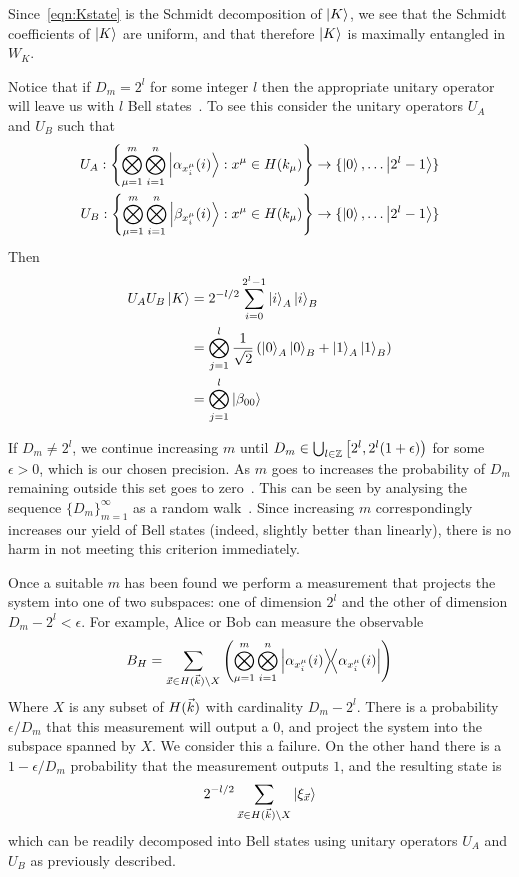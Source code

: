 Since~\eqref{eqn:Kstate} is the Schmidt decomposition of $\ket{K}$, we see that the Schmidt coefficients of $\ket{K}$ are uniform, and that therefore $\ket{K}$ is maximally entangled in $W_K$.

Notice that if $D_m = 2^l$ for some integer $l$ then the appropriate unitary operator will leave us with $l$ Bell states~\cite{bennett1996concentrating}. To see this consider the unitary operators $U_A$ and $U_B$ such that
\begin{align*}
U_A : \left\{
\bigotimes_{\mu=1}^m\bigotimes_{i=1}^n 
\ket{\alpha_{x_i^\mu}(i)}: x^\mu \in H(k_\mu) 
\right\} &\rightarrow \{\ket{0}, \ldots \ket{2^l-1
}\} \\
U_B :\left\{
\bigotimes_{\mu=1}^m\bigotimes_{i=1}^n 
\ket{\beta_{x_i^\mu}(i)}: x^\mu \in H(k_\mu) 
\right\} &\rightarrow \{\ket{0}, \ldots \ket{2^l-1
}\}
\end{align*}
Then
\begin{align*}
U_A U_B \ket{K} &= 2^{-l/2}\sum_{i=0}^{2^l-1} \ket{i}_A\ket{i}_B\\
&= \bigotimes_{j=1}^l \frac{1}{\sqrt{2}} \left(  \ket{0}_A \ket{0}_B + \ket{1}_A \ket{1}_B \right) \\
&= \bigotimes_{j=1}^l \ket{\beta_{00}}
\end{align*}

If $D_m \neq 2^l$, we continue increasing $m$ until $D_m \in \bigcup_{l \in \mathbb{Z} }\left[2^l, 2^l(1+\epsilon)\right)$ for some $\epsilon > 0$, which is our chosen precision. As $m$ goes to increases the probability of $D_m$ remaining outside this set goes to zero~\cite{bennett1996concentrating}. This can be seen by analysing the sequence $\{D_m\}_{m=1}^\infty$ as a random walk~\cite{bennett1996concentrating}.
Since increasing $m$ correspondingly increases our yield of Bell states (indeed, slightly better than linearly), there is no harm in not meeting this criterion immediately.

Once a suitable $m$ has been found we perform a measurement that projects the system into one of two subspaces: one of dimension $2^l$ and the other of dimension $D_m-2^l<\epsilon$. For example, Alice or Bob can measure the observable
$$
B_H = \sum_{\vx \in H(\vk) \setminus X} \left(
\bigotimes_{\mu=1}^m\bigotimes_{i=1}^n 
\dyad{\alpha_{x_i^\mu}(i)}{\alpha_{x_i^\mu}(i)} \right)
$$
Where $X$ is any subset of $H({\vec{k}})$ with cardinality $D_m - 2^l$.
There is a probability $\epsilon / D_m$ that this measurement will output a $0$, and project the system into the subspace spanned by $X$. We consider this a failure. On the other hand there is a $1-\epsilon / D_m$ probability that the measurement outputs $1$, and the resulting state is
$$
2^{-l/2} \sum_{{\vec{x}} \in H({\vec{k}}) \setminus X} \ket{ \xi_{\vec{x}} }
$$
which can be readily decomposed into Bell states using unitary operators $U_A$ and $U_B$ as previously described.
